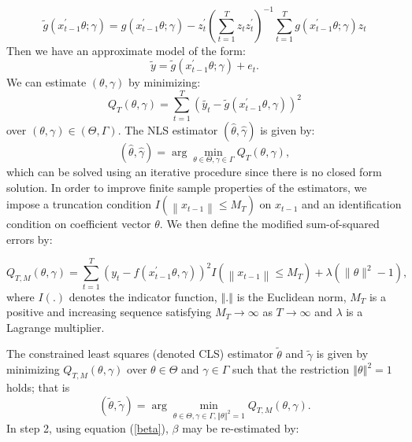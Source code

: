 \documentclass[a4paper,12pt,times,numbered,print,index]{report}
\numberwithin{equation}{section}
\begin{document}
$$\tilde{g} ( x_{t-1}^{\prime }\theta; \gamma) = g\left( x_{t-1}^{\prime }\theta; \gamma\right) - z_t^{\prime} \left( \sum_{t=1}^{T}z_t z_t^{\prime}\right)^{-1} \sum_{t=1}^{T} g\left( x_{t-1}^{\prime }\theta; \gamma\right) z_t$$ 
Then we have an approximate model of the form:
\begin{equation}
\tilde{y} = \tilde{g}\left( x_{t-1}^{\prime }\theta; \gamma\right) + e_t.
\label{trans_model}
\end{equation}
We can estimate $(\theta, \gamma)$ by minimizing:
$$
Q_{T}(\theta, \gamma)=\sum_{t=1}^{T}\left(\tilde{y_{t}}-\tilde{g}\left(x_{t-1}^{\prime} \theta, \gamma\right)\right)^{2}
$$
over $(\theta, \gamma) \in (\Theta, \Gamma)$.
The NLS estimator $(\hat{\theta}, \hat{\gamma})$ is given by:
\begin{equation*}
\left( \widehat{\theta},\widehat{\gamma}\right) =\arg \min_{\theta \in \Theta
	,\gamma \in \Gamma }Q_{T}\left( \theta ,\gamma \right),  \label{nls_c3}
\end{equation*}%
which can be solved using an iterative procedure since there is no closed form solution. In order to improve finite sample properties of the estimators, we impose a truncation condition $I\left(\left\|x_{t-1}\right\| \leq M_T\right)$ on $x_{t-1}$ and an identification condition on coefficient vector $\theta$. We then define the modified sum-of-squared errors by:

$$
Q_{T, M}(\theta, \gamma)=\sum_{t=1}^{T}\left(y_{t}-f\left(x_{t-1}^{\prime} \theta, \gamma\right)\right)^{2} I\left(\left\|x_{t-1}\right\| \leq M_{T}\right)+\lambda\left(\|\theta\|^{2}-1\right),
$$
where $I\left( .\right) $ denotes the indicator function, $%
\left\Vert .\right\Vert $ is the Euclidean norm, $M_T$ is a positive and increasing sequence satisfying $ M_{T}\rightarrow \infty $ as $T \rightarrow \infty $ and $\lambda $ is a Lagrange
multiplier. 

The constrained least squares (denoted CLS) estimator $\widetilde{\theta}$ and $%
\widetilde{\gamma}$ is given by minimizing $Q_{T,M}\left( \theta ,\gamma \right) 
$ over $\theta \in \Theta $ and $\gamma \in \Gamma $ such that the
restriction $\left\Vert \theta \right\Vert ^{2}=1$ holds; that is%
\begin{equation*}
\left( \widetilde{\theta},\widetilde{\gamma}\right) =\arg \min_{\theta \in \Theta
	,\gamma \in \Gamma ,\left\Vert \theta \right\Vert ^{2}=1}Q_{T,M}\left(
\theta ,\gamma \right) .  \label{cls_c3}
\end{equation*}%
In step 2, using equation (\ref{beta}), $\beta$ may be re-estimated by:
\end{document}
